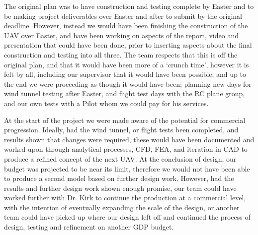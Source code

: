 \documentclass[../../main.tex]{subfiles}
\begin{document}

The original plan was to have construction and testing complete by Easter and to be making project deliverables over Easter and after to submit by the original deadline.
However, instead we would have been finishing the construction of the UAV over Easter, and have been working on aspects of the report, video and presentation that could have been done, prior to inserting aspects about the final construction and testing into all three.
The team respects that this is off the original plan, and that it would have been more of a ‘crunch time’, however it is felt by all, including our supervisor that it would have been possible, and up to the end we were proceeding as though it would have been; planning new days for wind tunnel testing after Easter, and flight test days with the RC plane group, and our own tests with a Pilot whom we could pay for his services.  

At the start of the project we were made aware of the potential for commercial progression.
Ideally, had the wind tunnel, or flight tests been completed, and results shown that changes were required, these would have been documented and worked upon through analytical processes, CFD, FEA, and iteration in CAD to produce a refined concept of the next UAV.
At the conclusion of design, our budget was projected to be near its limit, therefore we would not have been able to produce a second model based on further design work.
However, had the results and further design work shown enough promise, our team could have worked further with Dr. Kirk to continue the production at a commercial level, with the intention of eventually expanding the scale of the design, or another team could have picked up where our design left off and continued the process of design, testing and refinement on another GDP budget. 
\end{document}
